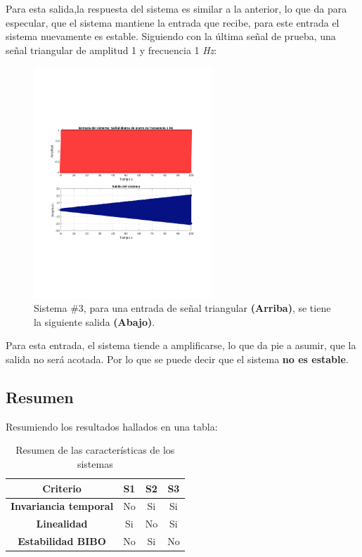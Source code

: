 			Para esta salida,la respuesta del sistema es similar a la anterior, lo que da para especular, que el sistema mantiene la entrada que recibe, para este entrada el sistema nuevamente es estable. Siguiendo con la última señal de prueba, una señal triangular de amplitud 1 y frecuencia 1 \textit{Hz}: 
			\begin{figure}[H]
				\center
				\includegraphics[width=0.6\textwidth,clip, trim = {2cm 7.0cm 2.2cm 7.0cm}]{../imgs/sistema_3_bibo_sawtooth.pdf}
				\caption{Sistema \#3, para una entrada de señal triangular \textbf{(Arriba)}, se tiene la siguiente salida \textbf{(Abajo)}.}
				\label{fig:s_3_bibo_sawtooth}
			\end{figure}
		
			Para esta entrada, el sistema tiende a amplificarse, lo que da pie a asumir, que la salida no será acotada. Por lo que se puede decir que el sistema \textbf{no es estable}.
			
	\subsection{Resumen}
		Resumiendo los resultados hallados en una tabla:
		\begin{table}[H]
			\center
			\begin{tabular}{|c|c|c|c|}
				\hline
				\textbf{Criterio} & \textbf{S1} & \textbf{S2} & \textbf{S3} \\
				\hline
				\textbf{Invariancia temporal} & No & Si & Si \\
				\hline
				\textbf{Linealidad} & Si & No & Si \\
				\hline
				\textbf{Estabilidad BIBO} & No & Si & No \\
				\hline			
			\end{tabular}
			\caption{Resumen de las características de los sistemas}
			\label{tab:summary_systems}
		\end{table}

